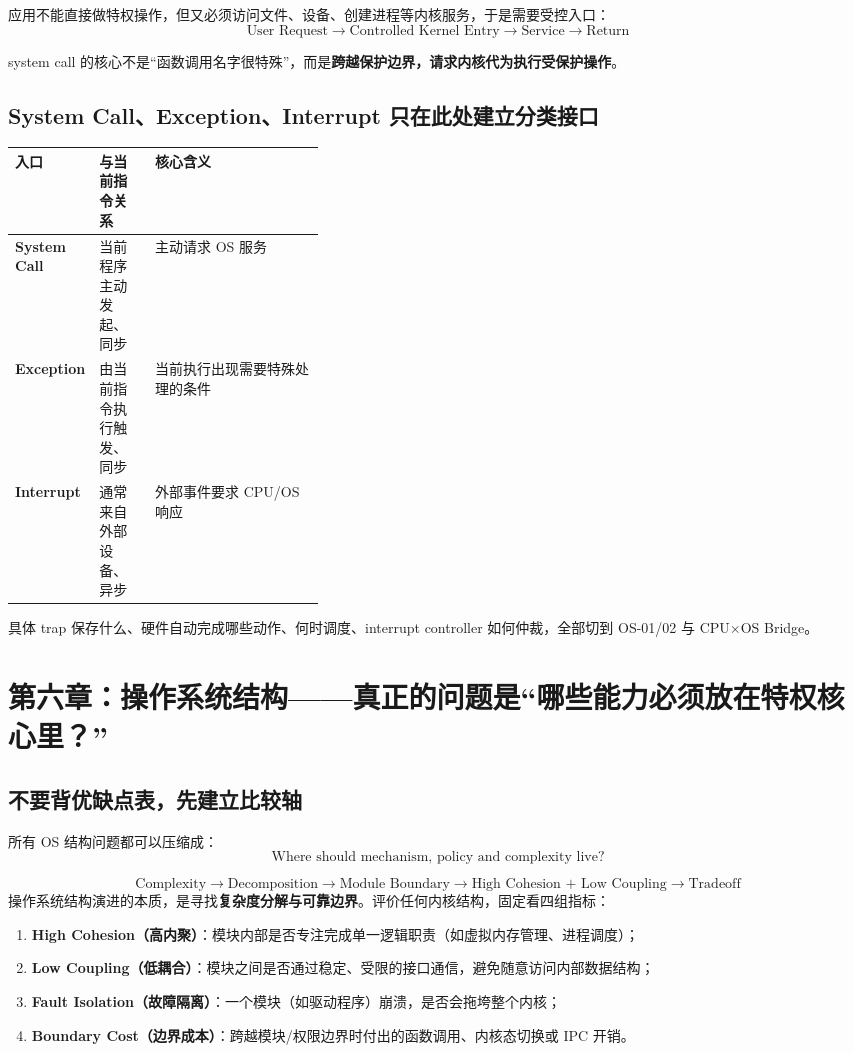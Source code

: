 \documentclass[11pt,a4paper]{ctexart}
\newcommand{\kw}[1]{\textbf{#1}}
\begin{document}
应用不能直接做特权操作，但又必须访问文件、设备、创建进程等内核服务，于是需要受控入口：
\[
\boxed{\text{User Request}\rightarrow\text{Controlled Kernel Entry}\rightarrow\text{Service}\rightarrow\text{Return}}
\]

system call 的核心不是“函数调用名字很特殊”，而是\kw{跨越保护边界，请求内核代为执行受保护操作}。

\subsection{System Call、Exception、Interrupt 只在此处建立分类接口}

\begin{center}
\begin{tabularx}{\linewidth}{>{\bfseries}p{0.18\linewidth} p{0.18\linewidth} X}
\toprule
入口 & 与当前指令关系 & 核心含义\\
\midrule
System Call & 当前程序主动发起、同步 & 主动请求 OS 服务\\
Exception & 由当前指令执行触发、同步 & 当前执行出现需要特殊处理的条件\\
Interrupt & 通常来自外部设备、异步 & 外部事件要求 CPU/OS 响应\\
\bottomrule
\end{tabularx}
\end{center}

具体 trap 保存什么、硬件自动完成哪些动作、何时调度、interrupt controller 如何仲裁，全部切到 OS-01/02 与 CPU$\times$OS Bridge。

\section{第六章：操作系统结构——真正的问题是“哪些能力必须放在特权核心里？”}

\subsection{不要背优缺点表，先建立比较轴}

所有 OS 结构问题都可以压缩成：
\[
\boxed{\text{Where should mechanism, policy and complexity live?}}
\]

\begin{corebox}
\[
\boxed{
\text{Complexity}
\to
\text{Decomposition}
\to
\text{Module Boundary}
\to
\text{High Cohesion + Low Coupling}
\to
\text{Tradeoff}
}
\]
操作系统结构演进的本质，是寻找\kw{复杂度分解与可靠边界}。评价任何内核结构，固定看四组指标：
\begin{enumerate}
  \item \kw{High Cohesion（高内聚）}：模块内部是否专注完成单一逻辑职责（如虚拟内存管理、进程调度）；
  \item \kw{Low Coupling（低耦合）}：模块之间是否通过稳定、受限的接口通信，避免随意访问内部数据结构；
  \item \kw{Fault Isolation（故障隔离）}：一个模块（如驱动程序）崩溃，是否会拖垮整个内核；
  \item \kw{Boundary Cost（边界成本）}：跨越模块/权限边界时付出的函数调用、内核态切换或 IPC 开销。
\end{enumerate}
\end{corebox}
\end{document}
